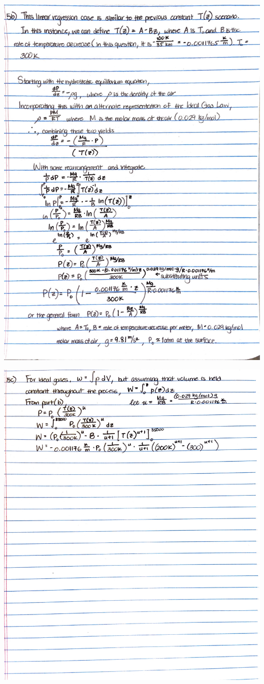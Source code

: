 \documentclass{homework}
\begin{document}
\begin{center}
    \includegraphics[width=15cm]{media/5b.JPG}
\end{center}
\begin{center}
    \includegraphics[width=15cm]{media/5c.JPG}
\end{center}
\end{document}
